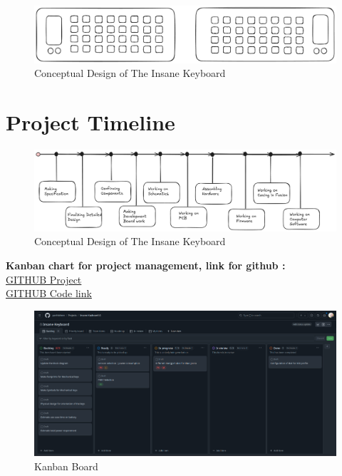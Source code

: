 \documentclass[a4paper,11pt]{article}%
\begin{document}
\begin{figure}[H]
    \centering
    \includegraphics[scale=0.38]{figures/concept.png}
    \caption{Conceptual Design of The Insane Keyboard}
\end{figure}
\vspace{0.2cm}

\section{Project Timeline}

\begin{figure}[H]
    \centering
    \includegraphics[scale=0.34]{figures/Timeline.png}
    \caption{Conceptual Design of The Insane Keyboard}
\end{figure}
\vspace{0.2cm}

\textbf{Kanban chart for project management, link for github :} \\
\href{https://github.com/users/parthishere/projects/2}{GITHUB Project}\\
\href{https://github.com/parthishere/Insane-Keyboard}{GITHUB Code link}
\begin{figure}[H]
    \centering
    \includegraphics[scale=0.26]{figures/kanban.png}
    \caption{Kanban Board}
\end{figure}
\end{document}
